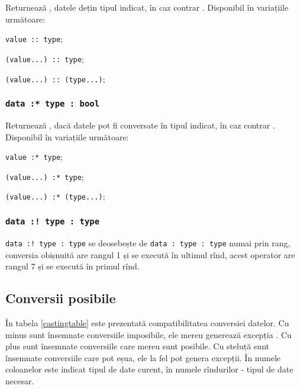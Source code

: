 Returnează \true, datele dețin tipul indicat, în caz contrar \false. Disponibil în variațiile următoare:
\begin{icItems}
	\item \texttt{value :: type};
	\item \texttt{(value...) :: type};
	\item \texttt{(value...) :: (type...)};
\end{icItems}

\subsubsection{\texttt{data :* type : bool}}

Returnează \true, dacă datele pot fi conversate în tipul indicat, în caz contrar \false. Disponibil în variațiile următoare:
\begin{icItems}
	\item \texttt{value :* type};
	\item \texttt{(value...) :* type};
	\item \texttt{(value...) :* (type...)};
\end{icItems}

\subsubsection{\texttt{data :! type : type}}

\texttt{data :! type : type} se deosebește de \texttt{data : type : type} numai prin rang, conversia obișnuită are rangul 1 și se execută în ultimul  rînd, acest operator are rangul 7 și se execută în primul rînd.

\subsection{Conversii posibile}

În tabela \ref{castingtable} este prezentată compatibilitatea conversiei datelor. Cu minus sunt însemnate conversiile imposibile, ele mereu generează excepția . Cu plus sunt însemnate conversiile care mereu sunt posibile. Cu steluță sunt însemnate conversiile care pot eșua, ele la fel pot genera excepții. În numele coloanelor este indicat tipul de date curent, în numele rîndurilor - tipul de date necesar.

